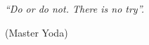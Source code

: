 \begin{center}
\vspace*{\fill}
\hspace{.45\textwidth} %
    \begin{minipage}{.5\textwidth}
    \flushright
    \noindent \textit{``Do or do not. There is no try''.}
    
    (Master Yoda)
    \end{minipage}
\end{center}